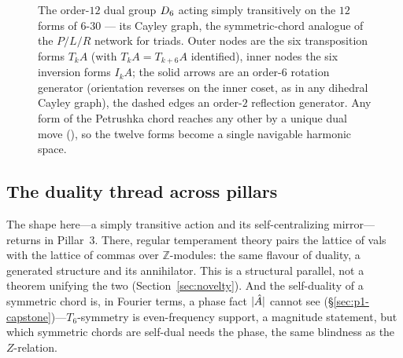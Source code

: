 \begin{figure}[ht]
\centering
{}
\caption{The order-$12$ dual group $D_{6}$ acting simply transitively on the $12$ forms of $6$-$30$ ---
its Cayley graph, the symmetric-chord analogue of the $P/L/R$ network for triads. Outer nodes are the six
transposition forms $T_kA$ (with $T_kA=T_{k+6}A$ identified), inner nodes the six inversion forms $I_kA$;
the solid arrows are an order-$6$ rotation generator (orientation reverses on the inner coset, as in any
dihedral Cayley graph), the dashed edges an order-$2$ reflection generator. Any form of the Petrushka chord
reaches any other by a unique dual move (), so the twelve forms become a single
navigable harmonic space.}
\label{fig:p2-cayley}
\end{figure}

\subsection{The duality thread across pillars}\label{sec:p2-thread}

The shape here---a simply transitive action and its self-centralizing mirror---returns in Pillar~3.
There, regular temperament theory pairs the lattice of vals with the lattice of commas over
$\mathbb{Z}$-modules: the same flavour of duality, a generated structure and its annihilator. This
is a structural parallel, not a theorem unifying the two (Section~\ref{sec:novelty}). And the
self-duality of a symmetric chord is, in Fourier terms, a phase fact $|\hat{A}|$ cannot see
(\S\ref{sec:p1-capstone})---$T_6$-symmetry is even-frequency support, a magnitude statement, but
which symmetric chords are self-dual needs the phase, the same blindness as the $Z$-relation.


